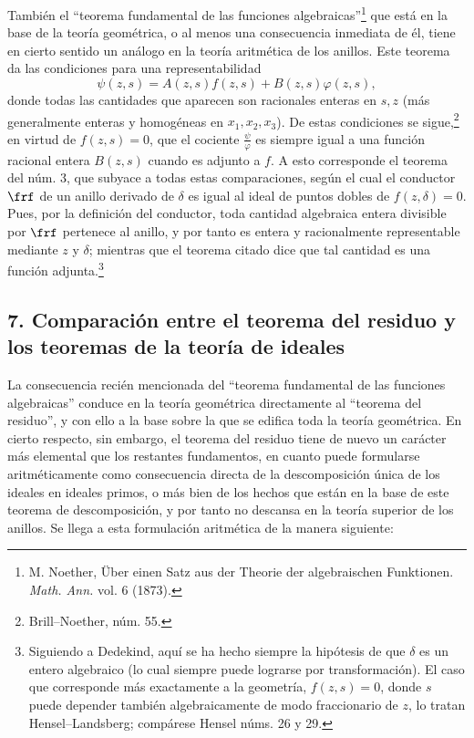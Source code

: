\documentclass[11pt]{article}
\begin{document}
También el ``teorema fundamental de las funciones algebraicas''\footnote{M. Noether, Über einen Satz aus der Theorie der algebraischen Funktionen. \emph{Math. Ann.} vol. 6 (1873).} que está en la base de la teoría geométrica, o al menos una consecuencia inmediata de él, tiene en cierto sentido un análogo en la teoría aritmética de los anillos. Este teorema da las condiciones para una representabilidad
\[
\psi(z,s)=A(z,s)f(z,s)+B(z,s)\varphi(z,s),
\]
donde todas las cantidades que aparecen son racionales enteras en \(s,z\) (más generalmente enteras y homogéneas en \(x_1,x_2,x_3\)). De estas condiciones se sigue,\footnote{Brill--Noether, núm. 55.} en virtud de \(f(z,s)=0\), que el cociente \(\frac{\psi}{\varphi}\) es siempre igual a una función racional entera \(B(z,s)\) cuando es adjunto a \(f\). A esto corresponde el teorema del núm. 3, que subyace a todas estas comparaciones, según el cual el conductor \(\frf\) de un anillo derivado de \(\delta\) es igual al ideal de puntos dobles de \(f(z,\delta)=0\). Pues, por la definición del conductor, toda cantidad algebraica entera divisible por \(\frf\) pertenece al anillo, y por tanto es entera y racionalmente representable mediante \(z\) y \(\delta\); mientras que el teorema citado dice que tal cantidad es una función adjunta.\footnote{Siguiendo a Dedekind, aquí se ha hecho siempre la hipótesis de que \(\delta\) es un entero algebraico (lo cual siempre puede lograrse por transformación). El caso que corresponde más exactamente a la geometría, \(f(z,s)=0\), donde \(s\) puede depender también algebraicamente de modo fraccionario de \(z\), lo tratan Hensel--Landsberg; compárese Hensel núms. 26 y 29.}

\subsection*{7. Comparación entre el teorema del residuo y los teoremas de la teoría de ideales}
La consecuencia recién mencionada del ``teorema fundamental de las funciones algebraicas'' conduce en la teoría geométrica directamente al ``teorema del residuo'', y con ello a la base sobre la que se edifica toda la teoría geométrica. En cierto respecto, sin embargo, el teorema del residuo tiene de nuevo un carácter más elemental que los restantes fundamentos, en cuanto puede formularse aritméticamente como consecuencia directa de la descomposición única de los ideales en ideales primos, o más bien de los hechos que están en la base de este teorema de descomposición, y por tanto no descansa en la teoría superior de los anillos. Se llega a esta formulación aritmética de la manera siguiente:
\end{document}
